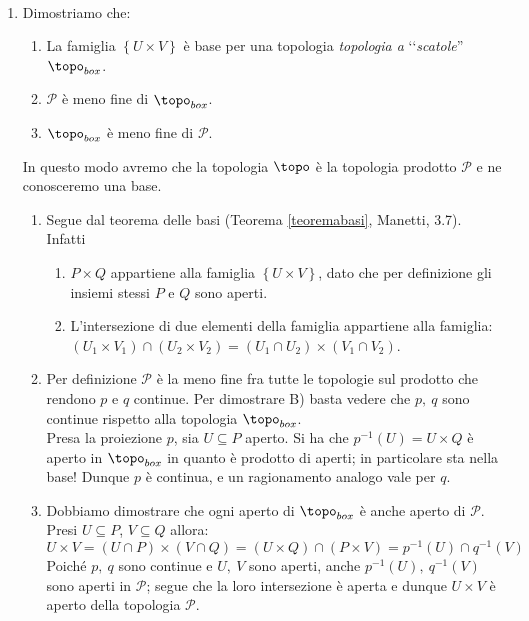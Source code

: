 \begin{demonstration}~{}
\begin{enumerate}[label=\Roman*]
\item Dimostriamo che:
\begin{enumerate}[label=(\Alph*)]
\item La famiglia $\left\{U\times V\right\}$ è base per una topologia \textit{topologia a} ‘‘\textit{scatole}''  $\topo_{box}$.
\item $\mathcal{P}$ è meno fine di $\topo_{box}$.
\item $\topo_{box}$ è meno fine di $\mathcal{P}$.
\end{enumerate}
In questo modo avremo che la topologia $\topo$ è la topologia prodotto $\mathcal{P}$ e ne conosceremo una base.
\begin{enumerate}[label=\alph*)]
\item Segue dal teorema delle basi (Teorema \ref{teoremabasi}, Manetti, 3.7). Infatti
\begin{enumerate}
\item $P\times Q$ appartiene alla famiglia $\left\{U\times V\right\}$, dato che per definizione gli insiemi stessi $P$ e $Q$ sono aperti.
\item L'intersezione di due elementi della famiglia appartiene alla famiglia:
$\left(U_1\times V_1\right)\cap\left(U_2\times V_2\right)=\left(U_1\cap U_2\right)\times \left(V_1\cap V_2\right)$.
\end{enumerate}
\item Per definizione $\mathcal{P}$ è la meno fine fra tutte le topologie sul prodotto che rendono $p$ e $q$ continue. Per dimostrare B) basta vedere che $p,\ q$ sono continue rispetto alla topologia $\topo_{box}$.\\
Presa la proiezione $p$, sia $U\subseteq P$ aperto. Si ha che $p^{-1}\left(U\right)=U\times Q$ è aperto in $\topo_{box}$ in quanto è prodotto di aperti; in particolare sta nella base! Dunque $p$ è continua, e un ragionamento analogo vale per $q$.
\item Dobbiamo dimostrare che ogni aperto di $\topo_{box}$ è anche aperto di $\mathcal{P}$.\\
Presi $U\subseteq P$, $V\subseteq Q$ allora:
\begin{equation*}
U\times V=\left(U\cap P\right)\times\left(V\cap Q\right)=\left(U\times Q\right)\cap \left(P\times V\right)=p^{-1}\left(U\right)\cap q^{-1}\left(V\right)
\end{equation*}
Poiché $p,\ q$ sono continue e $U,\ V$ sono aperti, anche $p^{-1}\left(U\right),\ q^{-1}\left(V\right)$ sono aperti in $\mathcal{P}$; segue che la loro intersezione è aperta e dunque $U\times V$ è aperto della topologia $\mathcal{P}$.

\end{enumerate}
\end{enumerate}
\end{demonstration}
